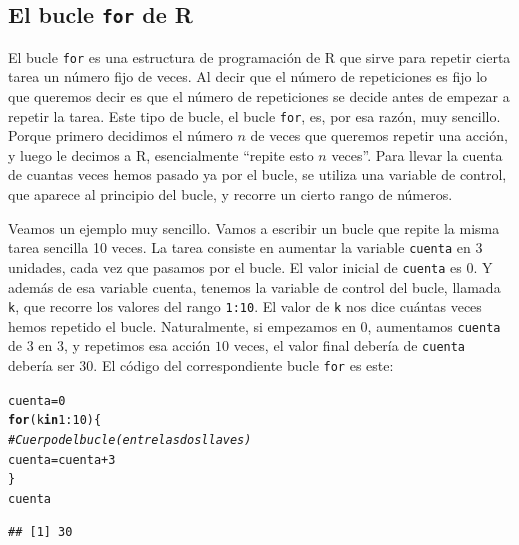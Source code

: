 \documentclass[10pt,a4paper]{article}\usepackage[]{graphicx}\usepackage[]{color}
\makeatletter
\newcommand{\hlnum}[1]{\textcolor[rgb]{0.686,0.059,0.569}{#1}}%
\newcommand{\hlcom}[1]{\textcolor[rgb]{0.678,0.584,0.686}{\textit{#1}}}%
\newcommand{\hlopt}[1]{\textcolor[rgb]{0,0,0}{#1}}%
\newcommand{\hlstd}[1]{\textcolor[rgb]{0.345,0.345,0.345}{#1}}%
\newcommand{\hlkwa}[1]{\textcolor[rgb]{0.161,0.373,0.58}{\textbf{#1}}}%
\newcommand{\hlkwb}[1]{\textcolor[rgb]{0.69,0.353,0.396}{#1}}%
\newenvironment{kframe}{%
 \def\at@end@of@kframe{}%
 \ifinner\ifhmode%
  \def\at@end@of@kframe{\end{minipage}}%
  \begin{minipage}{\columnwidth}%
 \fi\fi%
 \def\FrameCommand##1{\hskip\@totalleftmargin \hskip-\fboxsep
 \colorbox{shadecolor}{##1}\hskip-\fboxsep
     \hskip-\linewidth \hskip-\@totalleftmargin \hskip\columnwidth}%
 \MakeFramed {\advance\hsize-\width
   \@totalleftmargin\z@ \linewidth\hsize
   \@setminipage}}%
 {\par\unskip\endMakeFramed%
 \at@end@of@kframe}
\newenvironment{knitrout}{}{} %
\newcounter {cont01}
\makeatother
\begin{document}
\subsection{El bucle {\tt for} de R}
\label{tut04:subsec:BucleForR}

El bucle {\tt for} es una estructura de programación de R que sirve para repetir cierta tarea un número fijo de veces. Al decir que el número de repeticiones es fijo lo que queremos decir es que el número de repeticiones se decide antes de empezar a repetir la tarea. Este tipo de bucle, el bucle {\tt for}, es, por  esa razón, muy sencillo. Porque primero decidimos el número $n$ de veces que queremos repetir una acción, y luego le decimos a R, esencialmente ``repite esto $n$ veces''.  Para llevar la cuenta de cuantas veces hemos pasado ya por el bucle, se utiliza una {\sf variable de control}, que aparece al principio del bucle, y recorre un cierto rango de números.

Veamos un ejemplo muy sencillo. Vamos a escribir un bucle que repite la misma tarea sencilla 10 veces. La tarea consiste en aumentar la variable {\tt cuenta} en 3 unidades, cada vez que pasamos por el bucle. El valor inicial de {\tt cuenta} es 0. Y además de esa variable cuenta, tenemos la variable de control del bucle, llamada {\tt k}, que recorre los valores del rango {\tt 1:10}. El valor de {\tt k} nos dice cuántas veces hemos repetido el bucle. Naturalmente, si empezamos en $0$, aumentamos {\tt cuenta} de $3$ en $3$, y repetimos esa acción $10$ veces, el valor final debería de {\tt cuenta} debería ser $30$. El código del correspondiente bucle {\tt for} es este:

\begin{knitrout}
\color{fgcolor}\begin{kframe}
\begin{alltt}
    \hlstd{cuenta}\hlkwb{=}\hlnum{0}
    \hlkwa{for}\hlstd{(k} \hlkwa{in} \hlnum{1}\hlopt{:}\hlnum{10}\hlstd{)\{}
        \hlcom{# Cuerpo del bucle (entre las dos llaves)}
        \hlstd{cuenta} \hlkwb{=} \hlstd{cuenta} \hlopt{+} \hlnum{3}
    \hlstd{\}}
    \hlstd{cuenta}
\end{alltt}
\begin{verbatim}
## [1] 30
\end{verbatim}
\end{kframe}
\end{knitrout}
\end{document}

